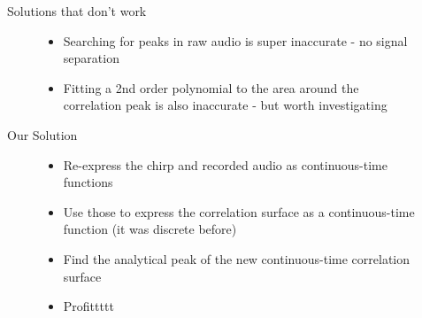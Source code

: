 \begin{frame}{Solutions that don't work}
	\begin{figure}
		\begin{itemize}
			\item Searching for peaks in raw audio is super inaccurate - no signal separation
			\item Fitting a 2nd order polynomial to the area around the correlation peak is also inaccurate - but worth investigating
		\end{itemize}
	\end{figure}
\end{frame}

\begin{frame}{Our Solution}
	\begin{figure}
		\begin{itemize}
			\item Re-express the chirp and recorded audio as continuous-time functions
			\item Use those to express the correlation surface as a continuous-time function (it was discrete before)
			\item Find the analytical peak of the new continuous-time correlation surface 
			\item Profittttt
		\end{itemize}
	\end{figure}
\end{frame}